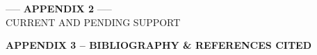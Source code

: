 \documentclass[12pt]{article}
\begin{document}
\pagebreak

  
\vspace*{\fill}
\begin{center}
{-----  {\bf APPENDIX 2} ----- \\
CURRENT AND PENDING SUPPORT} 
\end{center}
\vspace*{\fill}

\pagebreak


\begin{center}
{\bf APPENDIX 3 -- BIBLIOGRAPHY \& REFERENCES CITED}
\end{center}
\end{document}
